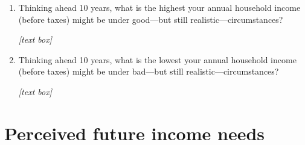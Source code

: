 \documentclass[11pt, headsepline]{article}
\begin{document}
\begin{enumerate}[resume]
    \item Thinking ahead 10 years, what is the highest your annual household income (before taxes) might be under good—but still realistic—circumstances?

    \textit{[text box]}


    \item Thinking ahead 10 years, what is the lowest your annual household income (before taxes) might be under bad—but still realistic—circumstances?

    \textit{[text box]}
    
\end{enumerate}

\section*{Perceived future income needs}
\end{document}
